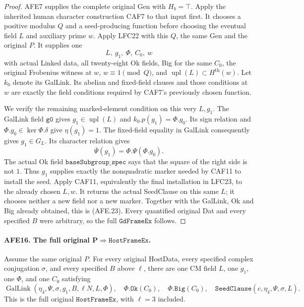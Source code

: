 \begin{proof}
AFE7 supplies the complete original Gen with \(H_b=\top\).
Apply the inherited human character construction CAF7
to that input first.  It chooses a positive modulus
\(Q\) and a seed-producing function before choosing
the eventual field \(L\) and auxiliary prime \(w\).
Apply LFC22 with this \(Q\), the same Gen and the
original \(P\).  It supplies one
\[
               L,\ g_1,\ \Phi,\ C_0,\ w
 \]
with actual Linked data, all twenty-eight Ok fields,
Big for the same \(C_0\), the original Frobenius
witness at \(w\), \(w\equiv1\pmod Q\), and
\(\operatorname{upl}(L)\subset H^{\mathrm{th}}(w)\).
Let \(k_0\) denote its GalLink.
Its abelian and fixed-field clauses and those
conditions at \(w\) are exactly the field conditions
required by CAF7's previously chosen function.

We verify the remaining marked-element condition
on this very \(L,g_1\).
The GalLink field \(\texttt{g0}\) gives
\(g_1\in\operatorname{upl}(L)\) and
\(k_0.p(g_1)=\Phi.g_0\).
Its sign relation and \(\Phi.g_0\in\ker\Phi.\delta\)
give \(\eta(g_1)=1\).
The fixed-field equality in GalLink consequently
gives \(g_1\in G_L\).
Its character relation gives
\[
             \overline\Psi(g_1)=\Phi.\Psi(\Phi.g_0).
 \]
The actual Ok field \(\texttt{baseSubgroup\_spec}\)
says that the square of the right side is not \(1\).
Thus \(g_1\) supplies exactly the nonquadratic marker
needed by CAF11 to install the seed.
Apply CAF11, equivalently the final installation in
LFC23, to the already chosen \(L,w\).
It returns the actual SeedClause on this same \(L\);
it chooses neither a new field nor a new marker.
Together with the GalLink, Ok and Big already
obtained, this is (AFE.23).
Every quantified original Dat and every specified
\(B\) were arbitrary, so the full \(\texttt{GdFrameEx}\)
follows.
\end{proof}

\paragraph{AFE16. The full original \(\boldsymbol{P\Rightarrow\texttt{HostFrameEx}}\).}
\label{claim:AFE16}
Assume the same original \(P\).
For every original HostData, every specified complex
conjugation \(\sigma\), and every specified \(B\)
above \(\ell\), there are one CM field \(L\), one
\(g_1\), one \(\Phi\), and one \(C_0\) satisfying
\[
 \operatorname{GalLink}(\eta_4,\Psi,\sigma,g_1,B,\ell N,L,\Phi),
 \quad\Phi.\texttt{Ok}(C_0),\quad\Phi.\texttt{Big}(C_0),
 \quad\texttt{SeedClause}(c,\eta_4,\Psi,\sigma,L).
                                                        \tag{AFE.24}
\]
This is the full original \(\texttt{HostFrameEx}\),
with \(\ell=3\) included.

